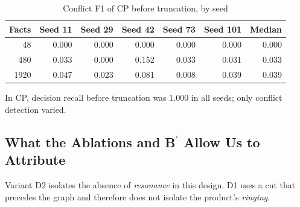 \documentclass[11pt,a4paper]{article}
\begin{document}
{\small
\begin{table}[htbp]\centering
\setlength{\tabcolsep}{4pt}
\caption{Conflict F1 of CP before truncation, by seed}\label{tab:3}
\begin{tabular}{rrrrrrr}
\toprule
\textbf{Facts} & \textbf{Seed 11} & \textbf{Seed 29} & \textbf{Seed 42} & \textbf{Seed 73} & \textbf{Seed 101} & \textbf{Median} \\
\midrule
48 & 0.000 & 0.000 & 0.000 & 0.000 & 0.000 & 0.000 \\
\midrule
480 & 0.033 & 0.000 & 0.152 & 0.033 & 0.031 & 0.033 \\
\midrule
1920 & 0.047 & 0.023 & 0.081 & 0.008 & 0.039 & 0.039 \\
\bottomrule
\end{tabular}
\end{table}
}
In CP, decision recall before truncation was 1.000 in all seeds; only conflict detection varied.

\subsection{What the Ablations and B\texorpdfstring{\ensuremath{^{\prime}}}{'} Allow Us to Attribute}\label{sec:5.2}
Variant D2 isolates the absence of \emph{resonance} in this design. D1 uses a cut that precedes the graph and therefore does not isolate the product's \emph{ringing}.
\end{document}
